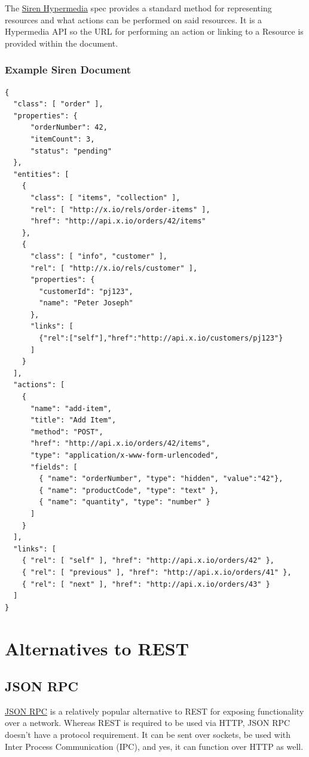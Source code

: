 \documentclass{book}
\begin{document}
The \href{http://sirenspec.org}{Siren Hypermedia} \cite{SIREN} spec provides a standard method for representing resources and what actions can be performed on said resources. It is a Hypermedia API so the URL for performing an action or linking to a Resource is provided within the document.

\subsubsection{Example Siren Document}

\begin{verbatim}
{
  "class": [ "order" ],
  "properties": { 
      "orderNumber": 42, 
      "itemCount": 3,
      "status": "pending"
  },
  "entities": [
    { 
      "class": [ "items", "collection" ], 
      "rel": [ "http://x.io/rels/order-items" ], 
      "href": "http://api.x.io/orders/42/items"
    },
    {
      "class": [ "info", "customer" ],
      "rel": [ "http://x.io/rels/customer" ], 
      "properties": { 
        "customerId": "pj123",
        "name": "Peter Joseph"
      },
      "links": [
        {"rel":["self"],"href":"http://api.x.io/customers/pj123"}
      ]
    }
  ],
  "actions": [
    {
      "name": "add-item",
      "title": "Add Item",
      "method": "POST",
      "href": "http://api.x.io/orders/42/items",
      "type": "application/x-www-form-urlencoded",
      "fields": [
        { "name": "orderNumber", "type": "hidden", "value":"42"},
        { "name": "productCode", "type": "text" },
        { "name": "quantity", "type": "number" }
      ]
    }
  ],
  "links": [
    { "rel": [ "self" ], "href": "http://api.x.io/orders/42" },
    { "rel": [ "previous" ], "href": "http://api.x.io/orders/41" },
    { "rel": [ "next" ], "href": "http://api.x.io/orders/43" }
  ]
}
\end{verbatim}


\section{Alternatives to REST}

\subsection{JSON RPC}

\href{http://www.jsonrpc.org/specification}{JSON RPC} \cite{JSONRPC} is a relatively popular alternative to REST for exposing functionality over a network. Whereas REST is required to be used via HTTP, JSON RPC doesn't have a protocol requirement. It can be sent over sockets, be used with Inter Process Communication (IPC), and yes, it can function over HTTP as well.
\end{document}
